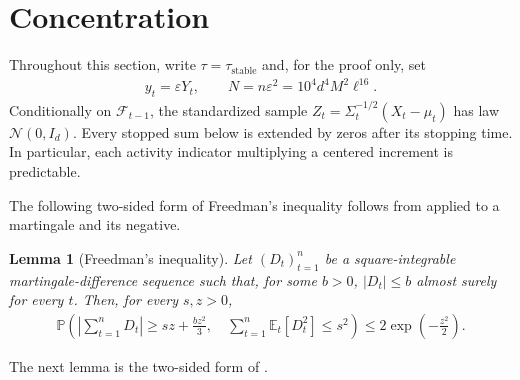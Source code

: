 \documentclass{article}
\newtheorem{lemma}[lemma]{Lemma}
\newcommand{\E}{\mathbb E}
\newcommand{\Pp}{\mathbb P}
\newcommand{\F}{\mathcal F}
\newcommand{\N}{\mathcal N}
\newcommand{\1}{\mathbf 1}
\newcommand{\eps}{\varepsilon}
\begin{document}
\section{Concentration}
\label{app:concentration}
Throughout this section, write $\tau=\tau_{\mathrm{stable}}$ and, for the
proof only, set
\begin{align}
    y_t=\eps Y_t,
    \qquad N=n\eps^2=10^4d^4M^2\ell^{16}.
    \label{eq:normalised-feedback}
\end{align}
Conditionally on $\F_{t-1}$, the standardized sample
$Z_t=\Sigma_t^{-1/2}(X_t-\mu_t)$ has law $\N(0,I_d)$.
Every stopped sum below is extended by zeros after its stopping time.
In particular, each activity indicator multiplying a centered increment
is predictable.

The following two-sided form of Freedman's inequality follows from
\citet[Theorem~3.10]{bercu2015concentration} applied to a martingale and its
negative.
\begin{lemma}[Freedman's inequality]
    \label{lem:freedman}
    Let $(D_t)_{t=1}^n$ be a square-integrable
    martingale-difference sequence such that, for some $b>0$,
    $|D_t|\leq b$ almost surely for every $t$. Then, for every $s,z>0$,
    \begin{align}
        \Pp\left(
        \left|\sum_{t=1}^n D_t\right|
        \geq sz+\frac{bz^2}{3},
        \quad
        \sum_{t=1}^n\E_t[D_t^2]\leq s^2
        \right)
        \leq
        2\exp\left(-\frac{z^2}{2}\right).
    \end{align}
\end{lemma}

\begingroup
\LetLtxMacro{\restatementlabel}{\label}
\freedmannonnegative*
\GlobalLetLtxMacro{\label}{\restatementlabel}
\endgroup

The next lemma is the two-sided form of
\citet[Theorem~3.26]{bercu2015concentration}.
\begingroup
\LetLtxMacro{\restatementlabel}{\label}
\selfnormalisedmartingale*
\GlobalLetLtxMacro{\label}{\restatementlabel}
\endgroup
\end{document}

